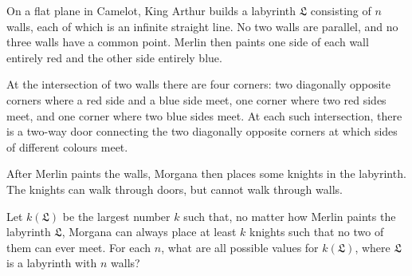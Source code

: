 On a flat plane in Camelot, King Arthur builds a labyrinth $\mathfrak{L}$ consisting of $n$ walls, each of which is an infinite straight line. No two walls are parallel, and no three walls have a common point. Merlin then paints one side of each wall entirely red and the other side entirely blue.

At the intersection of two walls there are four corners: two diagonally opposite corners where a red side and a blue side meet, one corner where two red sides meet, and one corner where two blue sides meet. At each such intersection, there is a two-way door connecting the two diagonally opposite corners at which sides of different colours meet.

After Merlin paints the walls, Morgana then places some knights in the labyrinth. The knights can walk through doors, but cannot walk through walls.

Let $k(\mathfrak{L})$ be the largest number $k$ such that, no matter how Merlin paints the labyrinth $\mathfrak{L}$, Morgana can always place at least $k$ knights such that no two of them can ever meet. For each $n$, what are all possible values for $k(\mathfrak{L})$, where $\mathfrak{L}$ is a labyrinth with $n$ walls?
